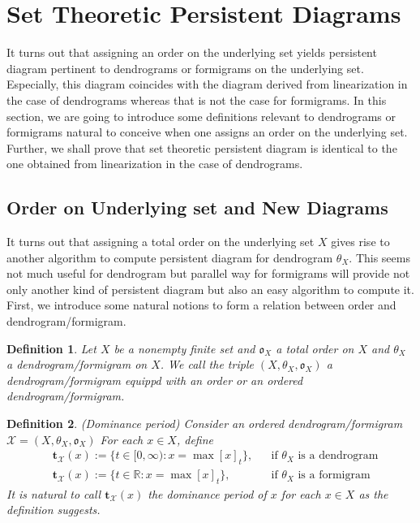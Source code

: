 \documentclass[a4paper,12pt]{article}
\newtheorem{definition}{Definition}[section]
\begin{document}
\newpage
\section{Set Theoretic Persistent Diagrams}

It turns out that assigning an order on the underlying set yields persistent diagram pertinent to dendrograms or formigrams on the underlying set. Especially, this diagram coincides with the diagram derived from linearization in the case of dendrograms whereas that is not the case for formigrams. In this section, we are going to introduce some definitions relevant to dendrograms or formigrams natural to conceive when one assigns an order on the underlying set. Further, we shall prove that set theoretic persistent diagram is identical to the one obtained from linearization in the case of dendrograms.   

\subsection{Order on Underlying set and New Diagrams}

It turns out that assigning a total order on the underlying set $X$ gives rise to another algorithm to compute persistent diagram for dendrogram $\theta_X$. This seems not much useful for dendrogram but parallel way for formigrams will provide not only another kind of persistent diagram but also an easy algorithm to compute it. First, we introduce some natural notions to form a relation between order and dendrogram/formigram.     


\begin{definition}  Let $X$ be a nonempty finite set and $\mathfrak{o}_X$ a total order on $X$ and $\theta_X$ a dendrogram/formigram on $X$. We call the triple $(X, \theta_X, \mathfrak{o}_X)$ a dendrogram/formigram equippd with an order or an ordered dendrogram/formigram.
\end{definition}


\begin{definition} (Dominance period) Consider an ordered dendrogram/formigram $\mathcal{X}=(X, \theta_X, \mathfrak{o}_X)$  For each $x\in X$, define
\begin{align*}
&\mathbf{t}_{\mathcal{X}}(x):=\{t\in [0,\infty): x=\max[x]_t\},&& \mbox{if $\theta_X$ is a dendrogram}\\
&\mathbf{t}_{\mathcal{X}}(x):=\{t\in\mathbb{R}: x=\max[x]_t\},&& \mbox{if $\theta_X$ is a formigram}
\end{align*}  \label{defeat}
It is natural to call $\mathbf{t}_\mathcal{X}(x)$ the dominance period of $x$ for each $x\in X$ as the definition suggests. 
\end{definition}
\end{document}
